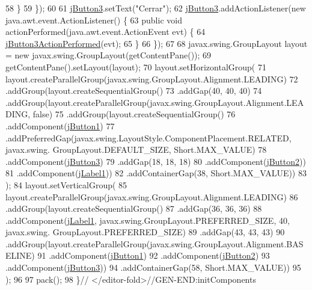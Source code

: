 \begin{DoxyCode}
58             \}
59         \});
60 
61         \mbox{\hyperlink{class_sockets_1_1_modulo_control_a30b4d0c6e8a1cb2425561314db79783a}{jButton3}}.setText(\textcolor{stringliteral}{"Cerrar"});
62         \mbox{\hyperlink{class_sockets_1_1_modulo_control_a30b4d0c6e8a1cb2425561314db79783a}{jButton3}}.addActionListener(\textcolor{keyword}{new} java.awt.event.ActionListener() \{
63             \textcolor{keyword}{public} \textcolor{keywordtype}{void} actionPerformed(java.awt.event.ActionEvent evt) \{
64                 \mbox{\hyperlink{class_sockets_1_1_modulo_control_a47a2f457c69a1633c1ba878b02220170}{jButton3ActionPerformed}}(evt);
65             \}
66         \});
67 
68         javax.swing.GroupLayout layout = \textcolor{keyword}{new} javax.swing.GroupLayout(getContentPane());
69         getContentPane().setLayout(layout);
70         layout.setHorizontalGroup(
71             layout.createParallelGroup(javax.swing.GroupLayout.Alignment.LEADING)
72             .addGroup(layout.createSequentialGroup()
73                 .addGap(40, 40, 40)
74                 .addGroup(layout.createParallelGroup(javax.swing.GroupLayout.Alignment.LEADING, \textcolor{keyword}{false})
75                     .addGroup(layout.createSequentialGroup()
76                         .addComponent(\mbox{\hyperlink{class_sockets_1_1_modulo_control_a96f51c5e98e140c3840d8b7a25288101}{jButton1}})
77                         .addPreferredGap(javax.swing.LayoutStyle.ComponentPlacement.RELATED, javax.swing.
      GroupLayout.DEFAULT\_SIZE, Short.MAX\_VALUE)
78                         .addComponent(\mbox{\hyperlink{class_sockets_1_1_modulo_control_a30b4d0c6e8a1cb2425561314db79783a}{jButton3}})
79                         .addGap(18, 18, 18)
80                         .addComponent(\mbox{\hyperlink{class_sockets_1_1_modulo_control_a93397e8a9f08ee30ecf474a4ac9a7b9e}{jButton2}}))
81                     .addComponent(\mbox{\hyperlink{class_sockets_1_1_modulo_control_a89f2debd0d83f763fe0bb701e05da054}{jLabel1}}))
82                 .addContainerGap(38, Short.MAX\_VALUE))
83         );
84         layout.setVerticalGroup(
85             layout.createParallelGroup(javax.swing.GroupLayout.Alignment.LEADING)
86             .addGroup(layout.createSequentialGroup()
87                 .addGap(36, 36, 36)
88                 .addComponent(\mbox{\hyperlink{class_sockets_1_1_modulo_control_a89f2debd0d83f763fe0bb701e05da054}{jLabel1}}, javax.swing.GroupLayout.PREFERRED\_SIZE, 40, javax.swing.
      GroupLayout.PREFERRED\_SIZE)
89                 .addGap(43, 43, 43)
90                 .addGroup(layout.createParallelGroup(javax.swing.GroupLayout.Alignment.BASELINE)
91                     .addComponent(\mbox{\hyperlink{class_sockets_1_1_modulo_control_a96f51c5e98e140c3840d8b7a25288101}{jButton1}})
92                     .addComponent(\mbox{\hyperlink{class_sockets_1_1_modulo_control_a93397e8a9f08ee30ecf474a4ac9a7b9e}{jButton2}})
93                     .addComponent(\mbox{\hyperlink{class_sockets_1_1_modulo_control_a30b4d0c6e8a1cb2425561314db79783a}{jButton3}}))
94                 .addContainerGap(58, Short.MAX\_VALUE))
95         );
96 
97         pack();
98     \}\textcolor{comment}{// </editor-fold>//GEN-END:initComponents}
\end{DoxyCode}
